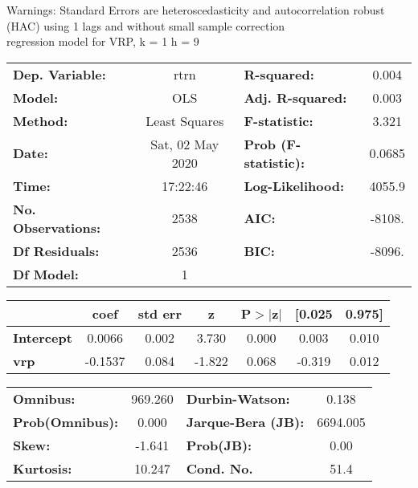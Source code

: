 Warnings: \newline
 [1] Standard Errors are heteroscedasticity and autocorrelation robust (HAC) using 1 lags and without small sample correction\\ 

regression model for VRP, k = 1 h = 9\begin{center}
\begin{tabular}{lclc}
\toprule
\textbf{Dep. Variable:}    &       rtrn       & \textbf{  R-squared:         } &     0.004   \\
\textbf{Model:}            &       OLS        & \textbf{  Adj. R-squared:    } &     0.003   \\
\textbf{Method:}           &  Least Squares   & \textbf{  F-statistic:       } &     3.321   \\
\textbf{Date:}             & Sat, 02 May 2020 & \textbf{  Prob (F-statistic):} &   0.0685    \\
\textbf{Time:}             &     17:22:46     & \textbf{  Log-Likelihood:    } &    4055.9   \\
\textbf{No. Observations:} &        2538      & \textbf{  AIC:               } &    -8108.   \\
\textbf{Df Residuals:}     &        2536      & \textbf{  BIC:               } &    -8096.   \\
\textbf{Df Model:}         &           1      & \textbf{                     } &             \\
\bottomrule
\end{tabular}
\begin{tabular}{lcccccc}
                   & \textbf{coef} & \textbf{std err} & \textbf{z} & \textbf{P$> |$z$|$} & \textbf{[0.025} & \textbf{0.975]}  \\
\midrule
\textbf{Intercept} &       0.0066  &        0.002     &     3.730  &         0.000        &        0.003    &        0.010     \\
\textbf{vrp}       &      -0.1537  &        0.084     &    -1.822  &         0.068        &       -0.319    &        0.012     \\
\bottomrule
\end{tabular}
\begin{tabular}{lclc}
\textbf{Omnibus:}       & 969.260 & \textbf{  Durbin-Watson:     } &    0.138  \\
\textbf{Prob(Omnibus):} &   0.000 & \textbf{  Jarque-Bera (JB):  } & 6694.005  \\
\textbf{Skew:}          &  -1.641 & \textbf{  Prob(JB):          } &     0.00  \\
\textbf{Kurtosis:}      &  10.247 & \textbf{  Cond. No.          } &     51.4  \\
\bottomrule
\end{tabular}
\end{center}


